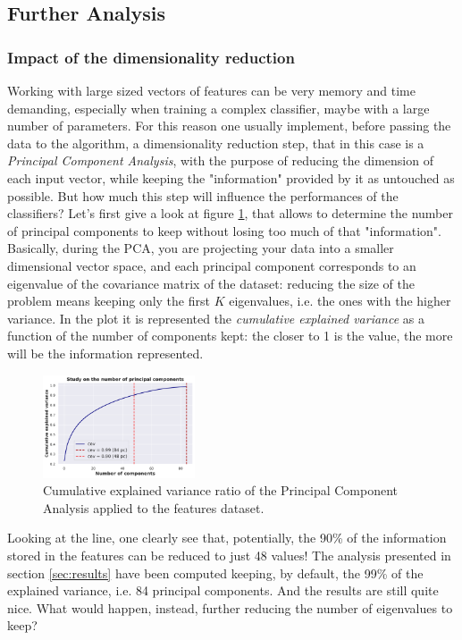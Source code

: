 
\subsection{Further Analysis}
\label{app:further_analysis}

\subsubsection{Impact of the dimensionality reduction}
\label{app:dim_reduction}
Working with large sized vectors of features can be very memory and time demanding, especially when training a complex classifier, maybe with a large number of parameters. For this reason one usually implement, before passing the data to the algorithm, a dimensionality reduction step, that in this case is a \textit{Principal Component Analysis}, with the purpose of reducing the dimension of each input vector, while keeping the "information" provided by it as untouched as possible. But how much this step will influence the performances of the classifiers? Let's first give a look at figure \ref{fig:cev}, that allows to determine the number of principal components to keep without losing too much of that "information". Basically, during the PCA, you are projecting your data into a smaller dimensional vector space, and each principal component corresponds to an eigenvalue of the covariance matrix of the dataset: reducing the size of the problem means keeping only the first $K$ eigenvalues, i.e. the ones with the higher variance. In the plot it is represented the \textit{cumulative explained variance} as a function of the number of components kept: the closer to 1 is the value, the more will be the information represented.
\begin{figure}[!h]
	\centering
	\includegraphics[width=0.4\textwidth]{pictures/cev.pdf}
	\caption{Cumulative explained variance ratio of the Principal Component Analysis applied to the features dataset.}
	\label{fig:cev}
\end{figure}
Looking at the line, one clearly see that, potentially, the 90\% of the information stored in the features can be reduced to just 48 values! The analysis presented in section \ref{sec:results} have been computed keeping, by default, the 99\% of the explained variance, i.e. 84 principal components. And the results are still quite nice. What would happen, instead, further reducing the number of eigenvalues to keep?
